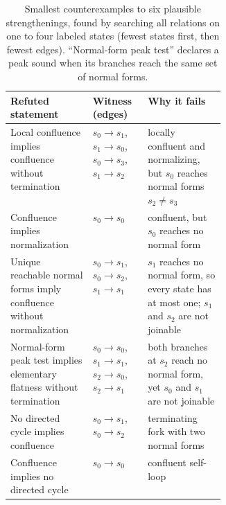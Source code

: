 \begin{table}[t]
\caption{Smallest counterexamples to six plausible strengthenings, found by searching all relations on one to four labeled states (fewest states first, then fewest edges). ``Normal-form peak test'' declares a peak sound when its branches reach the same set of normal forms.}
\label{tab:boundary-counterexamples}
\centering
\smallskip
\small
\setlength{\tabcolsep}{5pt}
\renewcommand{\arraystretch}{1.1}
\begin{tabularx}{\linewidth}{@{}Y l L{0.36\linewidth}@{}}
\toprule
Refuted statement & Witness (edges) & Why it fails \\
\midrule
Local confluence implies confluence without termination & $s_0{\to}s_1$, $s_1{\to}s_0$, $s_0{\to}s_3$, $s_1{\to}s_2$ & locally confluent and normalizing, but $s_0$ reaches normal forms $s_2 \neq s_3$ \\
Confluence implies normalization & $s_0{\to}s_0$ & confluent, but $s_0$ reaches no normal form \\
Unique reachable normal forms imply confluence without normalization & $s_0{\to}s_1$, $s_0{\to}s_2$, $s_1{\to}s_1$ & $s_1$ reaches no normal form, so every state has at most one; $s_1$ and $s_2$ are not joinable \\
Normal-form peak test implies elementary flatness without termination & $s_0{\to}s_0$, $s_1{\to}s_1$, $s_2{\to}s_0$, $s_2{\to}s_1$ & both branches at $s_2$ reach no normal form, yet $s_0$ and $s_1$ are not joinable \\
No directed cycle implies confluence & $s_0{\to}s_1$, $s_0{\to}s_2$ & terminating fork with two normal forms \\
Confluence implies no directed cycle & $s_0{\to}s_0$ & confluent self-loop \\
\bottomrule
\end{tabularx}
\end{table}
